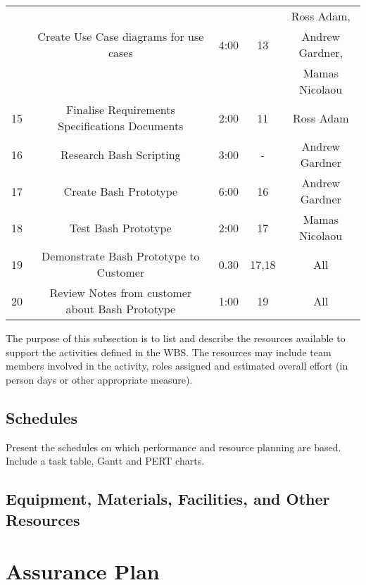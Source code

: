 \documentclass{l3deliverable}
\begin{document}
{\begin{table}[ht]
\begin{tabular}{|c |c |c |c |c |}
 & & & & Ross Adam, \\
 & Create Use Case diagrams for use cases&4:00  &13 &  Andrew Gardner, \\
 & & & & Mamas Nicolaou \\
\hline15 & Finalise Requirements Specifications Documents & 2:00 &11& Ross Adam \\
\hline16 & Research Bash Scripting & 3:00 &-&Andrew Gardner\\
\hline17 & Create Bash Prototype & 6:00 &16&Andrew Gardner \\
\hline18 & Test Bash Prototype & 2:00 &17& Mamas Nicolaou \\
\hline19 & Demonstrate Bash Prototype to Customer & 0.30 &17,18& All\\     
\hline20 & Review Notes from customer about Bash Prototype & 1:00 &19& All\\      

\hline %
\end{tabular}
\label{table:nonlin} %
\end{table}

The purpose of this subsection is to list and describe the resources
available to support the activities defined in the WBS. The resources
may include team members involved in the activity, roles assigned and
estimated overall effort (in person days or other appropriate
measure).


\subsection{Schedules}

Present the schedules on which performance and resource planning are
based. Include a task table, Gantt and PERT charts.


\subsection{Equipment, Materials, Facilities, and Other Resources}


\section{Assurance Plan}

}
\end{document}
